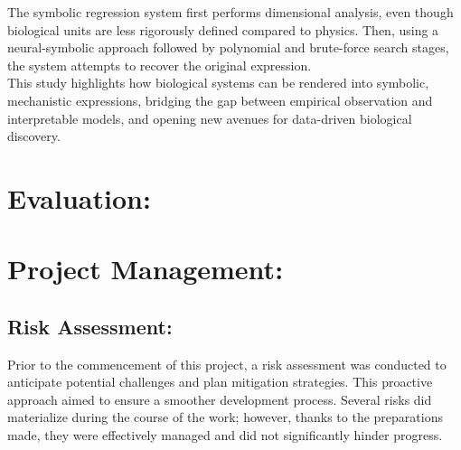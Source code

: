 \documentclass{article}
\begin{document}
The symbolic regression system first performs dimensional analysis, even though biological units are less rigorously defined compared to physics. Then, using a neural-symbolic approach followed by polynomial and brute-force search stages, the system attempts to recover the original expression.\\

This study highlights how biological systems can be rendered into symbolic, mechanistic expressions, bridging the gap between empirical observation and interpretable models, and opening new avenues for data-driven biological discovery.\\


\section{Evaluation:}



\newpage
{}

 



\section{Project Management: }


\subsection{Risk Assessment: }


Prior to the commencement of this project, a risk assessment was conducted to anticipate potential challenges and plan mitigation strategies. This proactive approach aimed to ensure a smoother development process. Several risks did materialize during the course of the work; however, thanks to the preparations made, they were effectively managed and did not significantly hinder progress.\\
\end{document}

